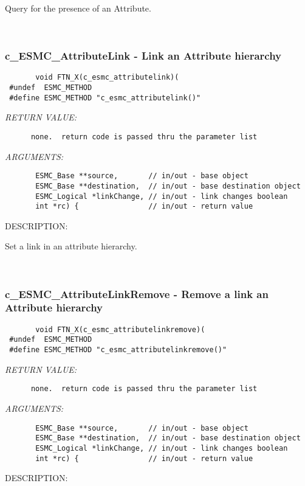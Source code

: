        Query for the presence of an Attribute.
   
 
\mbox{}\hrulefill\ 
 
\subsubsection [c\_ESMC\_AttributeLink] {c\_ESMC\_AttributeLink - Link an Attribute hierarchy}


  
\begin{verbatim}       void FTN_X(c_esmc_attributelink)(
 #undef  ESMC_METHOD
 #define ESMC_METHOD "c_esmc_attributelink()"\end{verbatim}{\em RETURN VALUE:}
\begin{verbatim}      none.  return code is passed thru the parameter list
   \end{verbatim}{\em ARGUMENTS:}
\begin{verbatim}       ESMC_Base **source,       // in/out - base object
       ESMC_Base **destination,  // in/out - base destination object
       ESMC_Logical *linkChange, // in/out - link changes boolean
       int *rc) {                // in/out - return value 
   \end{verbatim}
{\sf DESCRIPTION:\\ }


       Set a link in an attribute hierarchy.
   
 
\mbox{}\hrulefill\ 
 
\subsubsection [c\_ESMC\_AttributeLinkRemove] {c\_ESMC\_AttributeLinkRemove - Remove a link an Attribute hierarchy}


  
\begin{verbatim}       void FTN_X(c_esmc_attributelinkremove)(
 #undef  ESMC_METHOD
 #define ESMC_METHOD "c_esmc_attributelinkremove()"\end{verbatim}{\em RETURN VALUE:}
\begin{verbatim}      none.  return code is passed thru the parameter list
   \end{verbatim}{\em ARGUMENTS:}
\begin{verbatim}       ESMC_Base **source,       // in/out - base object
       ESMC_Base **destination,  // in/out - base destination object
       ESMC_Logical *linkChange, // in/out - link changes boolean
       int *rc) {                // in/out - return value 
   \end{verbatim}
{\sf DESCRIPTION:\\ }


